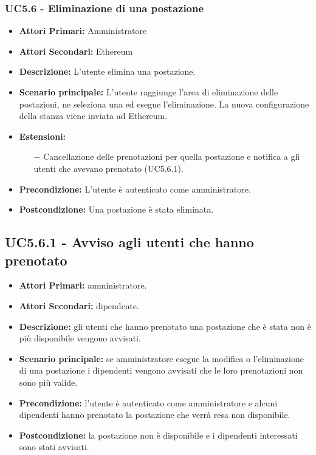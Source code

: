 \subsubsection{ UC5.6 - Eliminazione di una postazione}
\begin{itemize}
	\item\textbf{Attori Primari:}
	Amministratore 
	\item\textbf{Attori Secondari:}
	Ethereum
	\item\textbf{Descrizione:}
	L'utente elimina una postazione.
	\item\textbf{Scenario principale:} 
	L'utente raggiunge l'area di eliminazione delle postazioni, ne seleziona una ed esegue l'eliminazione. La nuova configurazione della stanza viene inviata ad Ethereum.
	\item\textbf{Estensioni:}
	\begin{itemize}
		\item[$-$] Cancellazione delle prenotazioni per quella postazione e notifica a gli utenti che avevano prenotato (UC5.6.1).
	\end{itemize}
	\item\textbf{Precondizione:} 
	L'utente è autenticato come amministratore.
	\item\textbf{Postcondizione:}
	Una postazione è stata eliminata.
\end{itemize}

\subsection{ UC5.6.1 - Avviso agli utenti che hanno prenotato}
\begin{itemize}
	\item\textbf{Attori Primari:}
	amministratore.
	\item\textbf{Attori Secondari:}
	dipendente.
	\item\textbf{Descrizione:}
	gli utenti che hanno prenotato una postazione che è stata non è più disponibile vengono avvisati.
	\item\textbf{Scenario principale:}
	se amministratore esegue la modifica o l'eliminazione di una postazione i dipendenti vengono avvisati che le loro prenotazioni non sono più valide.
	\item\textbf{Precondizione:}
	l'utente è autenticato come amministratore e alcuni dipendenti hanno prenotato la postazione che verrà resa non disponibile.
	\item\textbf{Postcondizione:}
	la postazione non è disponibile e i dipendenti interessati sono stati avvisati.
\end{itemize}

